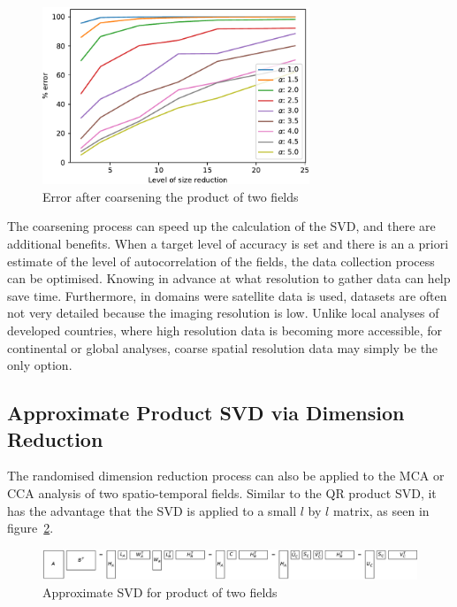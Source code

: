 \documentclass[ijgi,article,submit,moreauthors,pdftex,10pt,a4paper]{Definitions/mdpi}
\begin{document}
\begin{figure}[H]
\centering
\includegraphics[width=80mm]{Results/plotProductSpatialTemporalFieldsViaCoarsening.pdf}
\caption[Error after coarsening product of fields]{Error after coarsening the product of two fields}
\label{fig:plotProductSpatialTemporalFieldsViaCoarsening}
\end{figure}

The coarsening process can speed up the calculation of the SVD, and there are additional benefits. When a target level of accuracy is set and there is an a priori estimate of the level of autocorrelation of the fields, the data collection process can be optimised. Knowing in advance at what resolution to gather data can help save time. Furthermore, in domains were satellite data is used, datasets are often not very detailed because the imaging resolution is low. Unlike local analyses of developed countries, where high resolution data is becoming more accessible, for continental or global analyses, coarse spatial resolution data may simply be the only option.

\subsection{Approximate Product SVD via Dimension Reduction}
\label{sec:Results/Approximate Product SVD via Dimension Reduction}

The randomised dimension reduction process can also be applied to the MCA or CCA analysis of two spatio-temporal fields. Similar to the QR product SVD, it has the advantage that the SVD is applied to a small $l$ by $l$ matrix, as seen in figure~\ref{fig:randomisedSquareProductSVD}.

\begin{figure}[H]
\centering
\includegraphics[width=\textwidth]{Results/randomisedSquareProductSVD.pdf}
\caption[Approximate product SVD]{Approximate SVD for product of two fields}
\label{fig:randomisedSquareProductSVD}
\end{figure}
\end{document}
